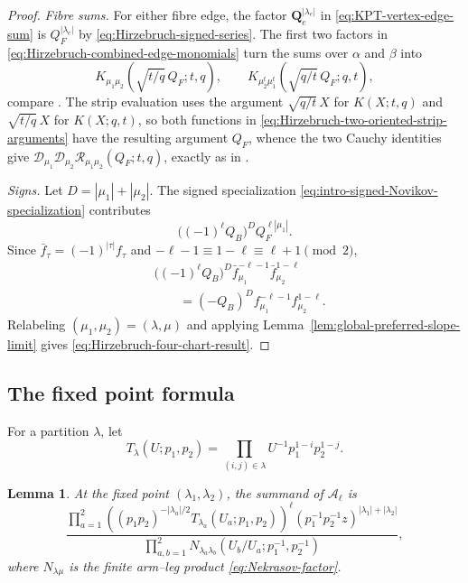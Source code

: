 \documentclass{amsart}
\newtheorem{lemma}{Lemma}
\theoremstyle{definition}
\numberwithin{equation}{section}
\begin{document}
\begin{proof}
\emph{Fibre sums.}  For either fibre edge, the factor \(\mathbf Q_e^{|\lambda_e|}\) in \eqref{eq:KPT-vertex-edge-sum} is \(Q_F^{|\lambda_e|}\) by \eqref{eq:Hirzebruch-signed-series}.  The first two factors in \eqref{eq:Hirzebruch-combined-edge-monomials} turn the sums over \(\alpha\) and \(\beta\) into
\begin{equation}
 K_{\mu_1\mu_2}\!
 \left(\sqrt{t/q}\,Q_F;t,q\right),\qquad
 K_{\mu_2^t\mu_1^t}\!
 \left(\sqrt{q/t}\,Q_F;q,t\right),
\label{eq:Hirzebruch-two-oriented-strip-arguments}
\end{equation}
compare \cite[equation~(3.2)]{TakiRefined}.  The strip evaluation \cite[equation~(3.3)]{TakiRefined} uses the argument \(\sqrt{q/t}\,X\) for \(K(X;t,q)\) and \(\sqrt{t/q}\,X\) for \(K(X;q,t)\), so both functions in \eqref{eq:Hirzebruch-two-oriented-strip-arguments} have the resulting argument \(Q_F\), whence the two Cauchy identities give \(\mathscr D_{\mu_1}\mathscr D_{\mu_2} \mathscr R_{\mu_1\mu_2}(Q_F;t,q)\), exactly as in \cite[equations~(3.10)--(3.11)]{TakiRefined}.

\emph{Signs.}  Let \(D=|\mu_1|+|\mu_2|\).  The signed specialization \eqref{eq:intro-signed-Novikov-specialization} contributes
\[
 \bigl((-1)^\ell Q_B\bigr)^D Q_F^{\ell|\mu_1|}.
\]
Since \(\bar f_\tau=(-1)^{|\tau|}f_\tau\) and \(-\ell-1\equiv1-\ell\equiv\ell+1\pmod2\),
\begin{equation}
\begin{aligned}
 &\bigl((-1)^\ell Q_B\bigr)^D
  \bar f_{\mu_1}^{-\ell-1}\bar f_{\mu_2}^{1-\ell}\\
 &\qquad=(-Q_B)^D
  f_{\mu_1}^{-\ell-1}f_{\mu_2}^{1-\ell}.
\end{aligned}
\label{eq:Hirzebruch-section-sign-conversion}
\end{equation}
Relabeling \((\mu_1,\mu_2)=(\lambda,\mu)\) and applying Lemma~\ref{lem:global-preferred-slope-limit} gives \eqref{eq:Hirzebruch-four-chart-result}.
\end{proof}

\subsection{The fixed point formula}
For a partition \(\lambda\), let
\begin{equation}
 T_\lambda(U;p_1,p_2)
 =\prod_{(i,j)\in\lambda}U^{-1}p_1^{1-i}p_2^{1-j}.
\label{eq:Hirzebruch-determinant-box-monomial}
\end{equation}

\begin{lemma}
\label{lem:Hirzebruch-ADHM-normalization}
At the fixed point \((\lambda_1,\lambda_2)\), the summand of \(\mathcal A_\ell\) is
\begin{equation}
 \frac{
 \displaystyle
 \prod_{a=1}^2
 \left((p_1p_2)^{-\lvert\lambda_a\rvert/2}
 T_{\lambda_a}(U_a;p_1,p_2)\right)^\ell
 (p_1^{-1}p_2^{-1}z)^{\lvert\lambda_1\rvert+\lvert\lambda_2\rvert}}
 {\displaystyle
 \prod_{a,b=1}^2
 N_{\lambda_a\lambda_b}
 (U_b/U_a;p_1^{-1},p_2^{-1})},
\label{eq:Hirzebruch-Nekrasov-fixed-term}
\end{equation}
where \(N_{\lambda\mu}\) is the finite arm--leg product \eqref{eq:Nekrasov-factor}.
\end{lemma}
\end{document}
